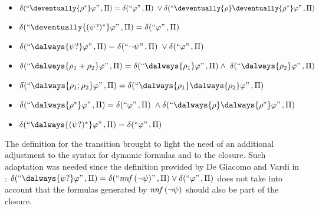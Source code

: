\begin{definition}
\begin{itemize}
  \item $\delta(\s{\deventually{\rho^{\ast}}\varphi},\Pi)= 
  \delta(\s{\varphi},\Pi)\; \vee \delta(\s{\deventually{\rho}\deventually{\rho^{\ast}}\varphi},\Pi)
  $
  
  
  \item $\delta(\s{\deventually{(\psi ?)^{\ast}}\varphi},\Pi)=
  \delta(\s{\varphi},\Pi)
  $
      

  \item $\delta(\s{\dalways{\psi ?}\varphi},\Pi)=
  \delta(\s{\neg \psi},\Pi)\; \vee \delta(\s{\varphi},\Pi)
  $
  
  \item $\delta(\s{\dalways{\rho_1 + \rho_2}\varphi},\Pi)=
  \delta(\s{\dalways{\rho_1}\varphi},\Pi) \wedge \; \delta(\s{\dalways{\rho_2}\varphi},\Pi)
  $

              
      
  \item $\delta(\s{\dalways{\rho_1 ; \rho_2}\varphi},\Pi)=
  \delta(\s{\dalways{\rho_1}\dalways{\rho_2}\varphi},\Pi)
  $

        
  \item $\delta(\s{\dalways{\rho^{\ast}}\varphi},\Pi)=
  \delta(\s{\varphi},\Pi)\; \wedge \delta(\s{\dalways{\rho}\dalways{\rho^{\ast}}\varphi},\Pi)
  $


      
  \item $\delta(\s{\dalways{(\psi ?)^{\ast}}\varphi},\Pi)=
  \delta(\s{\varphi},\Pi)
  $

\end{itemize}
\end{definition}

The definition for the transition brought to light the need of an additional adjustment to the syntax for dynamic formulas and to the closure. 
Such adaptation was needed since the definition provided by De Giacomo and Vardi in \cite{giavar15a}: $\delta(\s{\dalways{\psi ?}\varphi},\Pi) = \delta(\s{\nnf(\neg \psi)},\Pi) \vee \delta(\s{\varphi},\Pi)$ does not take into account that the formulas generated by $\mathit{nnf}\,(\neg \psi)$ should also be part of the closure.  

